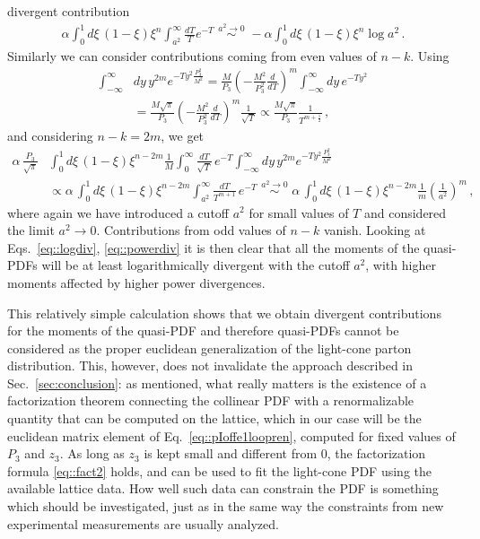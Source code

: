 divergent contribution
\begin{align}
\label{eq::logdiv}
	\alpha\int_0^1 d\xi\, 
	\left(1-\xi\right) \xi^n \int_{a^2}^{\infty} \frac{dT}{T}e^{-T}\,\,
	\stackrel{a^2\rightarrow 0}{\sim}\,\, 
	- \alpha\int_0^1 d\xi\, \left(1-\xi\right) \xi^n \log a^2\, .
\end{align}
Similarly we can consider contributions coming from even values of $n-k$. Using 
\begin{align}
	\int_{-\infty}^{\infty}
	&dy\, y^{2m} e^{-T y^2 \frac{P_3^2}{M^2}} = 
		\frac{M}{P_3} \left(-\frac{M^2}{P_3^2}\frac{d}{dT}\right)^m 
		\int_{-\infty}^{\infty} dy\,e^{-T y^2} \nonumber \\
	&= \frac{M\sqrt{\pi}}{P_3} 
	\left(-\frac{M^2}{P_3^2}\frac{d}{dT}\right)^m \frac{1}{\sqrt{T}}  
	\propto \frac{M \sqrt{\pi}}{P_3} \frac{1}{T^{m + \frac{1}{2}}}\, ,
\end{align}
and considering $n-k = 2m$, we get
\begin{align}
	\label{eq::powerdiv}
	\alpha\, \frac{P_3}{\sqrt{\pi}}
	&\int_0^1 d\xi\, \left(1-\xi\right) \xi^{n-2m} \frac{1}{M}
		\int_0^{\infty} \frac{dT}{\sqrt{T}}\, e^{-T } 
		\int_{-\infty}^{\infty} dy\, y^{2m} e^{-T y^2 \frac{P_3^2}{M^2}} \nonumber \\
	&\propto \alpha\, \int_0^1 d\xi\, \left(1-\xi\right) \xi^{n-2m}
		\int_{a^2}^{\infty} \frac{dT}{T^{m +1}}\, e^{-T} \,\, 
		\stackrel{a^2\rightarrow 0}{\sim}\,\, 
		\alpha\, \int_0^1 d\xi\, \left(1-\xi\right) \xi^{n-2m}
		\frac{1}{m} \left(\frac{1}{a^2} \right)^{m}\, ,
\end{align}
where again we have introduced a cutoff $a^2$ for small values of $T$ and
considered the limit $a^2 \rightarrow 0$. Contributions from odd values of $n-k$
vanish. Looking at Eqs.~\eqref{eq::logdiv}, \eqref{eq::powerdiv} it is then
clear that all the moments of the quasi-PDFs will be at least logarithmically
divergent with the cutoff $a^2$, with higher moments affected by higher power
divergences.

This relatively simple calculation shows that we obtain divergent contributions
for the moments of the quasi-PDF and therefore quasi-PDFs cannot be considered
as the proper euclidean generalization of the light-cone parton distribution.
This, however, does not invalidate the approach described in
Sec.~\ref{sec:conclusion}: as mentioned, what really matters is the existence
of a factorization theorem connecting the collinear PDF with a renormalizable
quantity that can be computed on the lattice, which in our case will be the
euclidean matrix element of Eq.~\eqref{eq::pIoffe1loopren}, computed for fixed
values of $P_3$ and $z_3$. As long as $z_3$ is kept small and different from
$0$, the factorization formula \eqref{eq::fact2} holds, and can be used to fit
the light-cone PDF using the available lattice data. How well such data can
constrain the PDF is something which should be investigated, just as in the same
way the constraints from new experimental measurements are usually analyzed.